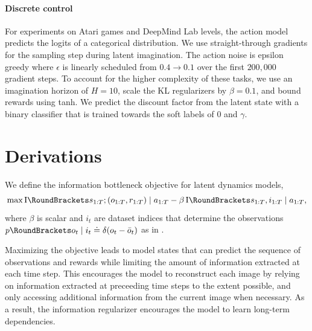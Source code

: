 \paragraph{Discrete control}

For experiments on Atari games and DeepMind Lab levels, the action model predicts the logits of a categorical distribution. We use straight-through gradients for the sampling step during latent imagination. The action noise is epsilon greedy where $\epsilon$ is linearly scheduled from $0.4\rightarrow0.1$ over the first $200,000$ gradient steps. To account for the higher complexity of these tasks, we use an imagination horizon of $H=10$, scale the KL regularizers by $\beta=0.1$, and bound rewards using tanh. We predict the discount factor from the latent state with a binary classifier that is trained towards the soft labels of $0$ and $\gamma$.

\clearpage
\section{Derivations}
\label{sec:derivations}

We define the information bottleneck objective \citep{tishby2000ib} for latent dynamics models,
\begin{equation}
\max
\MI{s_{1:T}; (o_{1:T},r_{1:T}) \mid a_{1:T}}
-\beta\,\MI{s_{1:T},i_{1:T} \mid a_{1:T}},
\end{equation}
where $\beta$ is scalar and $i_t$ are dataset indices that determine the observations $\p(o_t|i_t)\defined\delta(o_t-\bar{o}_t)$ as in \citet{alemi2016vib}.

Maximizing the objective leads to model states that can predict the sequence of observations and rewards while limiting the amount of information extracted at each time step. This encourages the model to reconstruct each image by relying on information extracted at preceeding time steps to the extent possible, and only accessing additional information from the current image when necessary. As a result, the information regularizer encourages the model to learn long-term dependencies.

